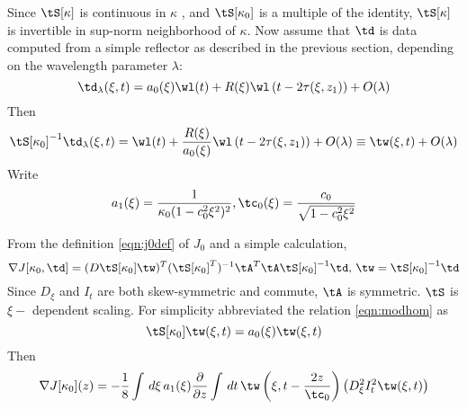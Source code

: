 Since $\tS[\kappa]$ is continuous in $\kappa$
\cite[]{BlazekStolkSymes:13}, and $\tS[\kappa_0]$ is a multiple of the
identity, $\tS[\kappa]$ is invertible in sup-norm neighborhood of
$\kappa$.
Now assume that $\td$ is data computed from a simple reflector as
described in the previous section, depending on the wavelength
parameter $\lambda$:
\[
\td_{\lambda}(\xi,t) = a_0(\xi)\wl(t) +
R(\xi)\wl\left(t-2\tau(\xi,z_1)\right) + O(\lambda)
\]
Then
\begin{equation}
\label{eqn:wtildedef}
\tS[\kappa_0]^{-1}\td_{\lambda}(\xi,t) = \wl(t) +
\frac{R(\xi)}{a_0(\xi)}\wl\left(t-2\tau(\xi,z_1)\right) + O(\lambda)
\equiv \tw(\xi,t) + O(\lambda)
\end{equation}
Write 
\[
a_1(\xi)=\frac{1}{\kappa_0 (1-c_0^2\xi^2)^2}, \tc_0(\xi) =
\frac{c_0}{\sqrt{1-c_0^2\xi^2}}
\]



From the definition \ref{eqn:j0def} of $J_0$ and a simple calculation,
\[
\nabla J[\kappa_0,\td] = (D\tS[\kappa_0]\tw)^T(\tS[\kappa_0]^T)^{-1}\tA^T\tA
\tS[\kappa_0]^{-1}\td,  \,\tw=\tS[\kappa_0]^{-1}\td
\]
Since $D_{\xi}$ and $I_t$ are both skew-symmetric and commute, $\tA$
is symmetric. $\tS$ is $\xi-$ dependent scaling. For simplicity
abbreviated the relation \ref{eqn:modhom} as
\[
\tS[\kappa_0]\tw(\xi,t) = a_0(\xi)\tw(\xi,t)
\]
Then
\[
\nabla J[\kappa_0](z) =
- 
\frac{1}{8} \int \,d\xi\,a_1(\xi)\frac{\partial}{\partial z} \int \,dt\, 
  \tw\left(\xi,t-\frac{2z}{\tc_0}\right)\left(D_{\xi}^2I_t^2 \tw(\xi,t)\right)
\]

